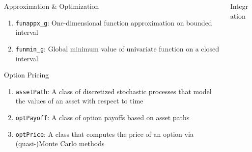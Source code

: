 \documentclass[final]{beamer}
\newlength{\onecolwid}
\newlength{\twocolwid}
\begin{document}
\begin{frame}[t]
\begin{columns}[t]
\begin{column}{\twocolwid}
\begin{columns}[t,totalwidth=\twocolwid]
\begin{column}{\onecolwid}
\begin{block}{Approximation \& Optimization}

\begin{enumerate}\setlength\itemsep{1em}
\item \texttt{funappx\_g}: One-dimensional function approximation on bounded interval \cite{FunappxFunmin}
\item \texttt{funmin\_g}: Global minimum value of univariate function on a closed interval \cite{FunappxFunmin}
\end{enumerate}
\end{block}


\begin{block}{Option Pricing}

\begin{enumerate}\setlength\itemsep{1em}
\item \texttt{assetPath}: A class of discretized stochastic processes that model the values of an asset with respect to time \cite{ChoEtal18b}
\item \texttt{optPayoff}: A class of option payoffs based on asset paths \cite{ChoEtal18b}
\item \texttt{optPrice}: A class that computes the price of an option via (quasi-)Monte Carlo methods \cite{ChoEtal18b}
\end{enumerate}

\end{block}


\end{column} %

\begin{column}{\onecolwid}\vspace{-.8in} %


\begin{block}{Integration}

\begin{enumerate} \setlength\itemsep{1em}


\end{enumerate}
\end{block}
\end{column}
\end{columns}
\end{column}
\end{columns}
\end{frame}
\end{document}
